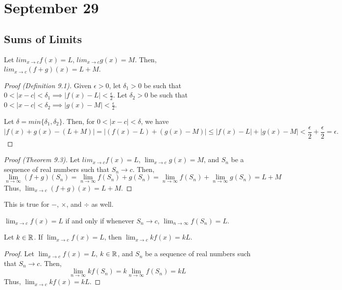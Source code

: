 \section{September 29}

\subsection{Sums of Limits}
\begin{theorem}
    Let $lim_{x \to c} f(x) = L$, $lim_{x \to c} g(x) = M$. Then, $lim_{x \to c} (f + g)(x) = L + M$.
\end{theorem}
\begin{proof}[Proof (Definition 9.1)]
    Given $\epsilon > 0$, let $\delta_1 > 0$ be such that $0 < |x - c| < \delta_1 \implies |f(x) - L| < \frac{\epsilon}{2}$. Let $\delta_2 > 0$ be such that $0 < |x - c| < \delta_2 \implies |g(x) - M| < \frac{\epsilon}{2}$.

    Let $\delta = min\{\delta_1, \delta_2\}$. Then, for $0 < |x - c| < \delta$, we have $$|f(x) + g(x) - (L + M)| = |(f(x) - L) + (g(x) - M)| \leq |f(x) - L| + |g(x) - M| < \frac{\epsilon}{2} + \frac{\epsilon}{2} = \epsilon.$$
\end{proof}
\begin{proof}[Proof (Theorem 9.3)]
    Let $lim_{x \to c} f(x) = L$, $\lim_{x \to c} g(x) = M$, and $S_n$ be a sequence of real numbers such that $S_n \to c$. Then, $$\lim_{n \to \infty} (f + g)(S_n) = \lim_{n \to \infty} f(S_n) + g(S_n) = \lim_{n \to \infty} f(S_n) + \lim_{n \to \infty} g(S_n) = L + M$$ Thus, $\lim_{x \to c} (f + g)(x) = L + M$.
\end{proof}
\begin{remark}
    This is true for $-$, $\times$, and $\div$ as well.
\end{remark}

\begin{definition}
    $\lim_{x \to c} f(x) = L$ if and only if whenever $S_n \to c$, $\lim_{n \to \infty} f(S_n) = L$.
\end{definition}

\begin{theorem}
    Let $k \in \mathbb{R}$. If $\lim_{x \to c} f(x) = L$, then $\lim_{x \to c} kf(x) = kL$.
\end{theorem}
\begin{proof}
    Let $\lim_{x \to c} f(x) = L$, $k \in \mathbb{R}$, and $S_n$ be a sequence of real numbers such that $S_n \to c$. Then, $$\lim_{n \to \infty} kf(S_n) = k\lim_{n \to \infty} f(S_n) = kL$$ Thus, $\lim_{x \to c} kf(x) = kL$.
\end{proof}

